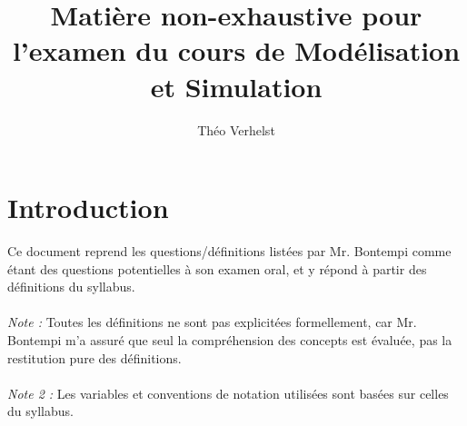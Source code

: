 \documentclass[a4paper]{article}
\author{Théo Verhelst}
\title{Matière non-exhaustive pour l'examen du cours de Modélisation et Simulation}
\begin{document}
\maketitle
\section{Introduction}
Ce document reprend les questions/définitions listées par Mr. Bontempi comme étant des questions potentielles à son examen
oral, et y répond à partir des définitions du syllabus.
\paragraph{}
\emph{Note :} Toutes les définitions ne sont pas explicitées formellement, car Mr. Bontempi m'a assuré que seul
la compréhension des concepts est évaluée, pas la restitution pure des définitions.
\paragraph{}
\emph{Note 2 :} Les variables et conventions de notation utilisées sont basées sur celles du syllabus.
\end{document}
